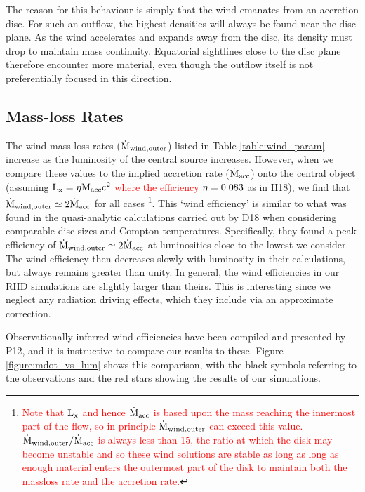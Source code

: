 \documentclass[a4paper,fleqn,usenatbib]{mnras}
\begin{document}
The reason for this behaviour is simply that the wind emanates from
an accretion disc. For such an outflow, the highest densities will
always be found near the disc plane. As the wind accelerates and
expands away from the disc, its density must drop to maintain mass
continuity. Equatorial sightlines close to the disc plane therefore
encounter more material, even though the outflow itself is not
preferentially focused in this direction.

\subsection{Mass-loss Rates}

The wind mass-loss rates ($\dot{\rm{M}}_{\rm{wind,outer}}$) listed in
Table \ref{table:wind_param}   
increase as the luminosity of the central source increases. However,
when we compare these values to the implied 
accretion rate ($\dot{\rm{M}}_{\rm{acc}}$) onto the central object
(assuming \textcolor{red}{$\rm{L_x=\eta\dot{M}_{acc}c^2}$ where
the efficiency  $\rm{\eta=0.083}$}  as in H18), we find that
$\dot{\rm{M}}_{\rm{wind,outer}}\simeq2\dot{\rm{M}}_{\rm{acc}}$ for all cases
\footnote{\textcolor{red}{Note that $\rm{L_{x}}$ and hence $\dot{\rm{M}}_{\rm{acc}}$
is based upon the mass reaching the innermost part of the flow, so in principle
$\dot{\rm{M}}_{\rm{wind,outer}}$ can exceed this value. 
$\dot{\rm{M}}_{\rm{wind,outer}}/\dot{\rm{M}}_{\rm{acc}}$ 
is always less than 15, the ratio at which the disk may become unstable
\citep{1986ApJ...306...90S} and so these wind solutions are stable as long
 as long as enough material enters the outermost part of the disk to maintain 
 both the massloss rate and the accretion rate.}}.
This `wind efficiency' is similar to what was found in the
quasi-analytic calculations carried out by D18
 when considering comparable disc sizes and
Compton temperatures. Specifically, they found a peak efficiency of
$\dot{\rm{M}}_{\rm{wind,outer}}\simeq2\dot{\rm{M}}_{\rm{acc}}$ at
luminosities close to the lowest we consider. The wind efficiency then 
decreases slowly with luminosity in their calculations, but always
remains greater than unity. In general, the wind efficiencies in our
RHD simulations are slightly larger than theirs. This is interesting since
we neglect any radiation driving effects, which they include via an
approximate correction.

Observationally inferred wind efficiencies have been compiled and
presented by P12, and it is instructive to
compare our results to these. Figure \ref{figure:mdot_vs_lum} shows 
this comparison, with the black symbols referring to the observations
and the red stars showing the results of our simulations. 
\end{document}
